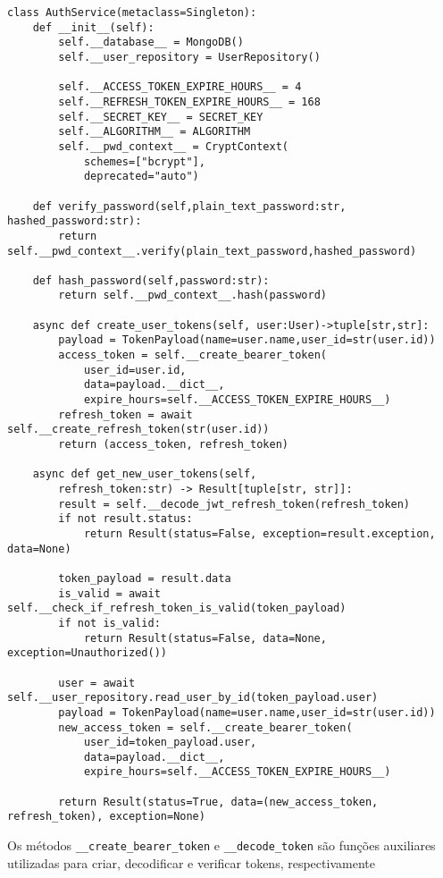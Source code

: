 \begin{verbatim}
class AuthService(metaclass=Singleton):
    def __init__(self):
        self.__database__ = MongoDB()
        self.__user_repository = UserRepository()

        self.__ACCESS_TOKEN_EXPIRE_HOURS__ = 4
        self.__REFRESH_TOKEN_EXPIRE_HOURS__ = 168
        self.__SECRET_KEY__ = SECRET_KEY
        self.__ALGORITHM__ = ALGORITHM
        self.__pwd_context__ = CryptContext(
            schemes=["bcrypt"],
            deprecated="auto")

    def verify_password(self,plain_text_password:str, hashed_password:str):
        return self.__pwd_context__.verify(plain_text_password,hashed_password)

    def hash_password(self,password:str):
        return self.__pwd_context__.hash(password)
    
    async def create_user_tokens(self, user:User)->tuple[str,str]:
        payload = TokenPayload(name=user.name,user_id=str(user.id))
        access_token = self.__create_bearer_token(
            user_id=user.id,
            data=payload.__dict__,
            expire_hours=self.__ACCESS_TOKEN_EXPIRE_HOURS__)
        refresh_token = await self.__create_refresh_token(str(user.id))
        return (access_token, refresh_token)
        
    async def get_new_user_tokens(self,
        refresh_token:str) -> Result[tuple[str, str]]:
        result = self.__decode_jwt_refresh_token(refresh_token)
        if not result.status:
            return Result(status=False, exception=result.exception, data=None)
        
        token_payload = result.data
        is_valid = await self.__check_if_refresh_token_is_valid(token_payload)
        if not is_valid:
            return Result(status=False, data=None, exception=Unauthorized())
        
        user = await self.__user_repository.read_user_by_id(token_payload.user)
        payload = TokenPayload(name=user.name,user_id=str(user.id))
        new_access_token = self.__create_bearer_token(
            user_id=token_payload.user,
            data=payload.__dict__,
            expire_hours=self.__ACCESS_TOKEN_EXPIRE_HOURS__)

        return Result(status=True, data=(new_access_token, refresh_token), exception=None)
\end{verbatim}

Os métodos \texttt{\_\_create\_bearer\_token} e \texttt{\_\_decode\_token} são funções auxiliares utilizadas para criar, decodificar e verificar tokens, respectivamente

